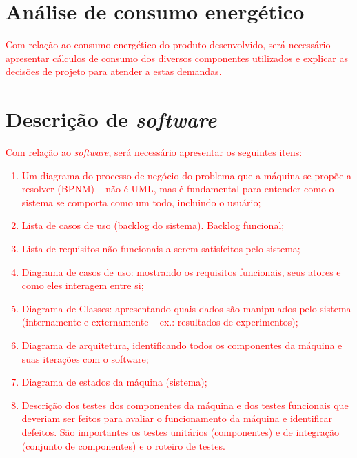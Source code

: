 \section{Análise de consumo energético}

\textcolor{red}{Com relação ao consumo energético do produto desenvolvido, será necessário apresentar cálculos de consumo dos diversos componentes utilizados e explicar as decisões de projeto para atender a estas demandas.}

\section{Descrição de \textit{software}}

\textcolor{red}{Com relação ao \textit{software}, será necessário apresentar os seguintes itens: %
\begin{enumerate}
    \item Um diagrama do processo de negócio do problema que a máquina se propõe a resolver (BPNM) – não é UML, mas é fundamental para entender como o sistema se comporta como um todo, incluindo o usuário;
    \item Lista de casos de uso (backlog do sistema). Backlog funcional;
    \item Lista de requisitos não-funcionais a serem satisfeitos pelo sistema;
    \item Diagrama de casos de uso: mostrando os requisitos funcionais, seus atores e como eles interagem entre si;
    \item Diagrama de Classes: apresentando quais dados são manipulados pelo sistema (internamente e externamente – ex.: resultados de experimentos);
    \item Diagrama de arquitetura, identificando todos os componentes da máquina e suas iterações com o software;
    \item Diagrama de estados da máquina (sistema);
    \item Descrição dos testes dos componentes da máquina e dos testes funcionais que deveriam ser feitos para avaliar o funcionamento da máquina e identificar defeitos. São importantes os testes unitários (componentes) e de integração (conjunto de componentes) e o roteiro de testes.
\end{enumerate}
}

